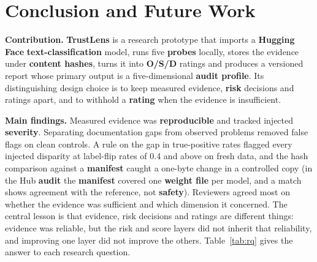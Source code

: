 \chapter{Conclusion and Future Work}\label{ch:conclusion}

\textbf{Contribution.} \textbf{TrustLens} is a research prototype that imports a \textbf{Hugging Face} \textbf{text-classification} model, runs five \textbf{probes} locally, stores the evidence under \textbf{content hashes}, turns it into \textbf{O/S/D} ratings and produces a versioned report whose primary output is a five-dimensional \textbf{audit profile}. Its distinguishing design choice is to keep measured evidence, \textbf{risk} decisions and ratings apart, and to withhold a \textbf{rating} when the evidence is insufficient.

\textbf{Main findings.} Measured evidence was \textbf{reproducible} and tracked injected \textbf{severity}. Separating documentation gaps from observed problems removed false flags on clean controls. A rule on the gap in true-positive rates flagged every injected disparity at label-flip rates of 0.4 and above on fresh data, and the hash comparison against a \textbf{manifest} caught a one-byte change in a controlled copy (in the Hub \textbf{audit} the \textbf{manifest} covered one \textbf{weight file} per model, and a match shows agreement with the reference, not \textbf{safety}). Reviewers agreed most on whether the evidence was sufficient and which dimension it concerned. The central lesson is that evidence, risk decisions and ratings are different things: evidence was reliable, but the risk and score layers did not inherit that reliability, and improving one layer did not improve the others. Table~\ref{tab:rq} gives the answer to each research question.

